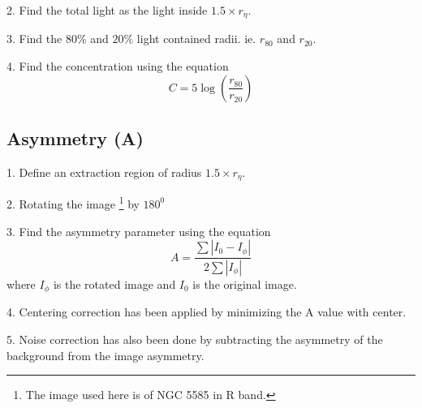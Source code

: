 \documentclass[a4paper,12pt]{article}
\begin{document}
2. Find the total light as the light inside $1.5 \times r_{\eta}$.

3. Find the $80\%$ and $20\%$ light contained radii. ie. $r_{80}$ and  $r_{20}$.

4. Find the concentration using the equation
\begin{equation}
C= 5 \log(\frac{r_{80}}{r_{20}})
\end{equation}

\subsection{Asymmetry (A)}

1. Define an extraction region of radius $1.5 \times r_{\eta}$.

2. Rotating the image \footnote{The image used here is of NGC 5585 in R band.} by $180^0$

3. Find the asymmetry parameter using the equation
\begin{equation}
A = \frac{\sum\left|I_0 - I_\phi\right|}{2\sum |I_\phi|}
\end{equation}
where $I_\phi$ is the rotated image and $I_0$ is the original image.

4. Centering correction has been applied by minimizing the A value with center.

5. Noise correction has also been done by subtracting the asymmetry of the background from the image asymmetry.
\end{document}
